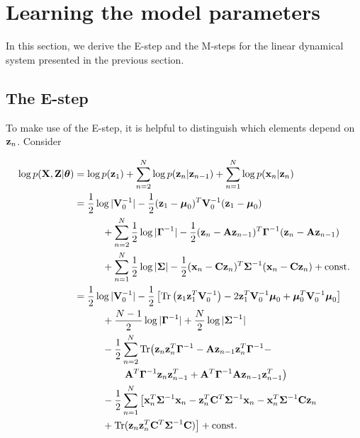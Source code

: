 \documentclass[11pt]{article}
\numberwithin{equation}{section}
\newcommand{\x}{{\bf x}}
\newcommand{\z}{{\bf z}}
\begin{document}

\section{Learning the model parameters}
In this section, we derive the E-step and the M-steps for the linear dynamical system presented in the previous section.

\subsection{The E-step}
To make use of the E-step, it is helpful to distinguish which elements depend on $\z_n$. Consider

\begin{align}
	\log p({\bf X}, {\bf Z}\vert \boldsymbol\theta) &= \log p(\z_1) + \sum_{n=2}^N \log p(\z_n\vert \z_{n-1}) + \sum_{n=1}^N \log p(\x_n\vert \z_n)\\
	   &=\frac{1}{2}\log\vert{\bf V}_0^{-1}\vert - \frac{1}{2}(\z_1 - \boldsymbol\mu_0)^T{\bf V}_0^{-1}(\z_1 - \boldsymbol\mu_0) \nonumber \\
	   &\hspace{1cm}+ \sum_{n=2}^N \frac{1}{2}\log\vert\boldsymbol\Gamma^{-1}\vert - \frac{1}{2}(\z_n - {\bf A z}_{n-1})^T\boldsymbol{\Gamma}^{-1}(\z_n - {\bf A z}_{n-1}) \nonumber \\
	   &\hspace{1cm}+\sum_{n=1}^N \frac{1}{2}\log\vert\boldsymbol\Sigma\vert -\frac{1}{2}(\x_n - {\bf C z}_n)^T \boldsymbol{\Sigma}^{-1}(\x_n - {\bf C z}_n) + \text{const.}\\
	   &= \frac{1}{2}\log \vert
	  {\bf V}_0^{-1}\vert -\frac{1}{2}\left[\text{Tr}\left(\z_1 \z_1^T {\bf V}_0^{-1}\right) -2 \z_1^T{\bf V}_0^{-1}\boldsymbol\mu_0 + \boldsymbol\mu_0^T {\bf V}_0^{-1}\boldsymbol\mu_0\right] \nonumber \\
	  &\hspace{1cm}+ \frac{N-1}{2}\log\vert\boldsymbol\Gamma^{-1}\vert + \frac{N}{2}\log\vert \boldsymbol\Sigma^{-1}\vert \nonumber \\
	  &\hspace{1cm}-\frac{1}{2} \sum_{n=2}^{N}\text{Tr}\big(\z_n\z_n^T\boldsymbol\Gamma^{-1} -{\bf A} \z_{n-1}\z_n^T\boldsymbol\Gamma^{-1} - \nonumber\\
	  &\hspace{1.8cm}{\bf A}^T\boldsymbol{\Gamma}^{-1}\z_n\z_{n-1}^T + {\bf A}^T \boldsymbol\Gamma^{-1}{\bf A}\z_{n-1}\z_{n-1}^T\big) \nonumber\\
	  &\hspace{1cm}-\frac{1}{2}\sum_{n=1}^N\big[\x_n^T\boldsymbol{\Sigma}^{-1}\x_n - \z_n^T{\bf C}^T\boldsymbol\Sigma^{-1}\x_n - \x_n^T\boldsymbol{\Sigma}^{-1}{\bf C}\z_n  \\
	  &\hspace{1cm} + \text{Tr}(\z_n\z_n^T{\bf C}^T\boldsymbol\Sigma^{-1}{\bf C})\big] + \text{const.} \label{eq:complete-log-likelihood}
\end{align}
\end{document}
